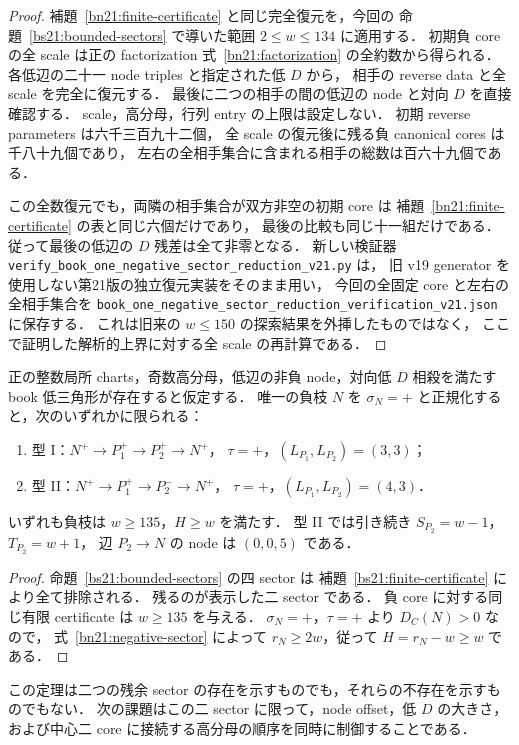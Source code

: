 \begin{proof}
補題~\ref{bn21:finite-certificate} と同じ完全復元を，今回の
命題~\ref{bs21:bounded-sectors} で導いた範囲 $2\le w\le134$ に適用する．
初期負 core の全 scale は正の factorization
式~\eqref{bn21:factorization} の全約数から得られる．
各低辺の二十一 node triples と指定された低 $D$ から，
相手の reverse data と全 scale を完全に復元する．
最後に二つの相手の間の低辺の node と対向 $D$ を直接確認する．
scale，高分母，行列 entry の上限は設定しない．
初期 reverse parameters は六千三百九十二個，
全 scale の復元後に残る負 canonical cores は千八十九個であり，
左右の全相手集合に含まれる相手の総数は百六十九個である．

この全数復元でも，両隣の相手集合が双方非空の初期 core は
補題~\ref{bn21:finite-certificate} の表と同じ六個だけであり，
最後の比較も同じ十一組だけである．従って最後の低辺の $D$ 残差は全て非零となる．
新しい検証器 \nolinkurl{verify_book_one_negative_sector_reduction_v21.py} は，
旧 v19 generator を使用しない第21版の独立復元実装をそのまま用い，
今回の全固定 core と左右の全相手集合を
\nolinkurl{book_one_negative_sector_reduction_verification_v21.json} に保存する．
これは旧来の $w\le150$ の探索結果を外挿したものではなく，
ここで証明した解析的上界に対する全 scale の再計算である．
\end{proof}

\begin{theorem}
\label{bs21:two-sectors}
正の整数局所 charts，奇数高分母，低辺の非負 node，対向低 $D$ 相殺を満たす
book 低三角形が存在すると仮定する．
唯一の負枝 $N$ を $\sigma_N=+$ と正規化すると，次のいずれかに限られる：
\begin{enumerate}
 \item 型 I：$N^+\to P_1^+\to P_2^+\to N^+$，
 $\tau=+$，$(L_{P_1},L_{P_2})=(3,3)$；
 \item 型 II：$N^+\to P_1^+\to P_2^-\to N^+$，
 $\tau=+$，$(L_{P_1},L_{P_2})=(4,3)$．
\end{enumerate}
いずれも負枝は $w\ge135$，$H\ge w$ を満たす．
型 II では引き続き $S_{P_2}=w-1$，$T_{P_2}=w+1$，
辺 $P_2\to N$ の node は $(0,0,5)$ である．
\end{theorem}

\begin{proof}
命題~\ref{bs21:bounded-sectors} の四 sector は
補題~\ref{bs21:finite-certificate} により全て排除される．
残るのが表示した二 sector である．
負 core に対する同じ有限 certificate は $w\ge135$ を与える．
$\sigma_N=+$，$\tau=+$ より $D_C(N)>0$ なので，
式~\eqref{bn21:negative-sector} によって $r_N\ge2w$，従って $H=r_N-w\ge w$ である．
\end{proof}

この定理は二つの残余 sector の存在を示すものでも，それらの不存在を示すものでもない．
次の課題はこの二 sector に限って，node offset，低 $D$ の大きさ，
および中心二 core に接続する高分母の順序を同時に制御することである．
